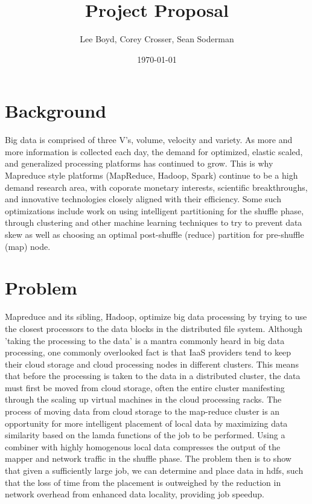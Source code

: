 \documentclass[14pt]{extarticle}
\begin{document}
\title{Project Proposal}
\author{Lee Boyd,\n
        Corey Crosser,\n
        Sean Soderman}
\date{\today}
\maketitle

\section{Background}
Big data is comprised of three V's, volume, velocity and variety. As more and more information is collected each day, the demand for optimized, elastic scaled, and generalized processing platforms has continued to grow. This is why Mapreduce style platforms (MapReduce, Hadoop, Spark) continue to be a high demand research area, with coporate monetary interests, scientific breakthroughs, and innovative technologies closely aligned with their efficiency.  Some such optimizations include work on using intelligent partitioning for the shuffle phase, through clustering and other machine learning techniques to try to prevent data skew as well as choosing an optimal post-shuffle (reduce) partition for pre-shuffle (map) node.  


\section{Problem}
Mapreduce and its sibling, Hadoop, optimize big data processing by trying to use the closest processors to the data blocks in the distributed file system.  Although 'taking the processing to the data' is a mantra commonly heard in big data processing, one commonly overlooked fact is that IaaS providers tend to keep their cloud storage and cloud processing nodes in different clusters.  This means that before the processing is taken to the data in a distributed cluster, the data must first be moved from cloud storage, often the entire cluster manifesting through the scaling up virtual machines in the cloud processing racks.  The process of moving data from cloud storage to the map-reduce cluster is an opportunity for more intelligent placement of local data by maximizing data similarity based on the lamda functions of the job to be performed.  Using a combiner with highly homogenous local data compresses the output of the mapper and network traffic in the shuffle phase.  The problem then is to show that given a sufficiently large job, we can determine and place data in hdfs, such that the loss of time from the placement is outweighed by the reduction in network overhead from enhanced data locality, providing job speedup.
\end{document}
